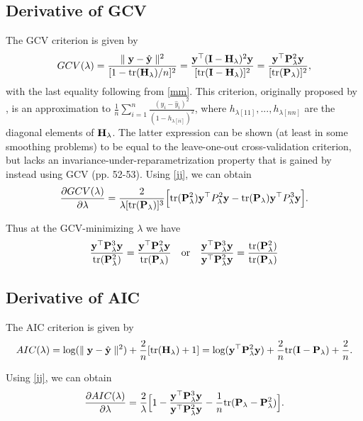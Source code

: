 \documentclass[article]{jss}
\begin{document}
\begin{appendix}
\subsection{Derivative of GCV}
The GCV criterion is given by
\begin{align*}
GCV(\lambda)=\frac{\parallel {\bf y}-\hat{{\bf y}}\parallel ^2}{[1-\mbox{tr}({\bf H}_\lambda)/n]^2}=\frac{{\bf y}^\top  ({\bf I}-{\bf H}_\lambda)^2{\bf y}}{[\mbox{tr}({\bf I}-{\bf H}_\lambda)]^2}=\frac{{\bf y}^\top  {\bf P}_\lambda^2{\bf y}}{[\mbox{tr}({\bf P}_\lambda)]^2},
\end{align*}
with the last equality following from \eqref{mm}. This criterion, originally proposed by \citep{craven_smoothing_1979}, is an approximation to $\frac{1}{n}\sum_{i=1}^n \frac{(y_i-\hat{y}_i)^2}{(1-h_{\lambda [ii]})^2}$, where $h_{\lambda [11]},...,h_{\lambda [nn]}$ are the diagonal elements of ${\bf H}_\lambda$. The latter expression can be shown (at least in some smoothing problems) to be equal to the leave-one-out cross-validation criterion, but lacks an invariance-under-reparametrization property that is gained by instead using GCV \citep{wahba_spline_1990}(pp. 52-53). Using \eqref{jj}, we can obtain
\begin{align}
\frac{\partial GCV(\lambda)}{\partial \lambda}=\frac{2}{\lambda [\mbox{tr}({\bf P}_\lambda)]^3}\Big[\mbox{tr}({\bf P}_\lambda^2){\bf y}^\top  P_\lambda^2{\bf y}-\mbox{tr}({\bf P}_\lambda){\bf y}^\top  P_\lambda^3{\bf y} \Big].
\end{align}

Thus at the GCV-minimizing $\lambda$ we have
\begin{align*}
\frac{{\bf y}^\top  {\bf P}_\lambda^3{\bf y}}{\mbox{tr}({\bf P}_\lambda^2)}=\frac{{\bf y}^\top  {\bf P}_\lambda^2{\bf y}}{\mbox{tr}({\bf P}_\lambda)}\quad \mbox{or} \quad \frac{{\bf y}^\top  {\bf P}_\lambda^3{\bf y}}{{\bf y}^\top  {\bf P}_\lambda^2{\bf y}}=\frac{\mbox{tr}({\bf P}_\lambda^2)}{\mbox{tr}({\bf P}_\lambda)}
\end{align*}

\subsection{Derivative of AIC}

The AIC criterion is given by
\begin{align*}
AIC(\lambda)=\mbox{log} (\parallel {\bf y}-\hat{{\bf y}}\parallel ^2)+\frac{2}{n}[\mbox{tr}({\bf H}_\lambda)+1]=\mbox{log}({\bf y}^\top  {\bf P}_\lambda^2{\bf y})+\frac{2}{n}\mbox{tr}({\bf I}-{\bf P}_\lambda)+\frac{2}{n}.
\end{align*}

Using \eqref{jj}, we can obtain
\begin{align}
\frac{\partial AIC(\lambda)}{\partial \lambda}=\frac{2}{\lambda}\Big[1-\frac{{\bf y}^\top  {\bf P}_\lambda^3{\bf y}}{{\bf y}^\top  {\bf P}_\lambda^2{\bf y}}-\frac{1}{n}\mbox{tr}({\bf P}_\lambda-{\bf P}_\lambda^2)\Big].
\end{align}


\end{appendix}
\end{document}

